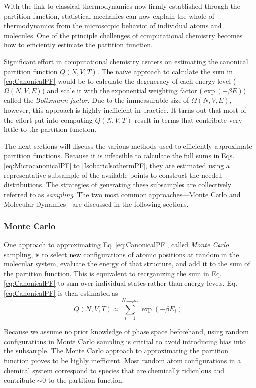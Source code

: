 With the link to classical thermodynamics now firmly established through the
partition function, statistical mechanics can now explain the whole of
thermodynamics from the microscopic behavior of individual atoms and molecules.
One of the principle challenges of computational chemistry becomes how to
efficiently estimate the partition function.

Significant effort in computational chemistry centers on estimating the
canonical partition function $Q(N, V, T)$. The na\"ive approach to calculate the
sum in \ref{eq:CanonicalPF} would be to calculate the degeneracy of each energy
level ($\Omega(N, V, E)$) and scale it with the exponential weighting factor
($\exp(-\beta E)$) called the \emph{Boltzmann factor}. Due to the immeasurable
size of $\Omega(N, V, E)$, however, this approach is highly inefficient in
practice. It turns out that most of the effort put into computing $Q(N, V, T)$
result in terms that contribute very little to the partition function.

The next sections will discuss the various methods used to efficiently
approximate partition functions. Because it is infeasible to calculate the full
sums in Eqs. \ref{eq:MicrocanonicalPF} to \ref{IsobaricIsothermPF}, they are
estimated using a representative subsample of the available points to construct
the needed distributions. The strategies of generating these subsamples are
collectively referred to as \emph{sampling}. The two most common
approaches---Monte Carlo and Molecular Dynamics---are discussed in the following
sections.

\subsubsection{Monte Carlo}

One approach to approximating Eq. \ref{eq:CanonicalPF}, called \emph{Monte
Carlo} sampling, is to select new configurations of atomic positions at random
in the molecular system, evaluate the energy of that structure, and add it to
the sum of the partition function. This is equivalent to reorganizing the sum in
Eq. \ref{eq:CanonicalPF} to sum over individual states rather than energy
levels. Eq. \ref{eq:CanonicalPF} is then estimated as
\begin{equation}
   Q(N, V, T) \approx \sum_{i=1}^{N_{samples}} \exp(-\beta E_i)
   \label{eq:MonteCarloCanonicalPF}
\end{equation}

Because we assume no prior knowledge of phase space beforehand, using random
configurations in Monte Carlo sampling is critical to avoid introducing bias
into the subsample. The Monte Carlo approach to approximating the partition
function proves to be highly inefficient. Most random atom configurations in a
chemical system correspond to species that are chemically ridiculous and
contribute $\sim 0$ to the partition function.

